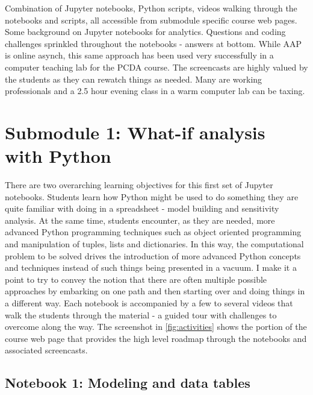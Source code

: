 \documentclass[ited,blindrev]{informs3}              %
\begin{document}
Combination of Jupyter notebooks, Python scripts, videos walking through the notebooks and scripts, all accessible from submodule specific course web pages. Some background on Jupyter notebooks for analytics. Questions and coding challenges sprinkled throughout the notebooks - answers at bottom. While AAP is online asynch, this same approach has been used very successfully in a computer teaching lab for the PCDA course. The screencasts are highly valued by the students as they can rewatch things as needed. Many are working professionals and a 2.5 hour evening class in a warm computer lab can be taxing.

\section{Submodule 1: What-if analysis with Python}

There are two overarching learning objectives for this first set of Jupyter notebooks. Students learn how Python might be used to do something they are quite familiar with doing in a spreadsheet - model building and sensitivity analysis. At the same time, students encounter, as they are needed, more advanced Python programming techniques such as object oriented programming and manipulation of tuples, lists and dictionaries. In this way, the computational problem to be solved drives the introduction of more advanced Python concepts and techniques instead of such things being presented in a vacuum. I make it a point to try to convey the notion that there are often multiple possible approaches by embarking on one path and then starting over and doing things in a different way. Each notebook is accompanied by a few to several videos that walk the students through the material - a guided tour with challenges to overcome along the way. The screenshot in \ref{fig:activities} shows the portion of the course web page that provides the high level roadmap through the notebooks and associated screencasts.
 
 
\subsection{Notebook 1: Modeling and data tables}
\end{document}
